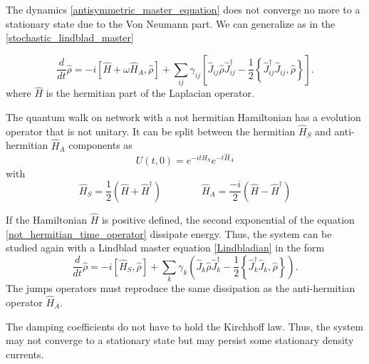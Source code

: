 The dynamics \eqref{antisymmetric_master_equation} does not converge no more to a stationary state due to the Von Neumann part.
We can generalize as in the \eqref{stochastic_lindblad_master} 

\begin{equation}
    \frac{d}{dt}\hat \rho = -i\left[\hat H + \omega\hat H_{A},\hat\rho\right] + \sum_{ij}\gamma_{ij}\left[\hat J_{ij} \hat\rho\hat J_{ij}^\dagger -\frac{1}{2} \left\{ \hat J_{ij}^\dagger \hat J_{ij}, \hat\rho\right\}\right].
\end{equation}
where $\hat H$ is the hermitian part of the Laplacian operator.


\bigskip

The quantum walk on network with a not hermitian Hamiltonian has a evolution operator that is not unitary. It can be split between the hermitian $\hat H_S$ and anti-hermitian $\hat H_A$ components as
\begin{equation}\label{not_hermitian_time_operator}
    U(t,0) = e^{-it\hat H_S} e^{-t\hat H_A}
\end{equation}
with
\begin{equation}
    \hat H_S =  \frac{1}{2}\left(\hat H + \hat H^\dagger\right) \qquad \qquad
    \hat H_A = \frac{-i}{2}\left(\hat H - \hat H^\dagger\right)
\end{equation}

If the Hamiltonian $\hat H$ is positive defined, the second exponential of the equation \eqref{not_hermitian_time_operator} dissipate energy. 
Thus, the system can be studied again with a Lindblad master equation \eqref{Lindbladian} in the form
\begin{equation}
    \frac{d}{dt}\hat\rho = -i\left[\hat H_S,\hat\rho\right] + \sum_k \gamma_k \left(\hat J_k \hat\rho \hat J^\dagger_k - \frac{1}{2}\left\{ \hat J^\dagger_k\hat J_k, \hat\rho\right\} \right).
\end{equation}
The jumps operators must reproduce the same dissipation as the anti-hermitian operator $\hat H_A$.

The damping coefficients do not have to hold the Kirchhoff law. Thus, the system may not converge to a stationary state but may persist some stationary density currents.